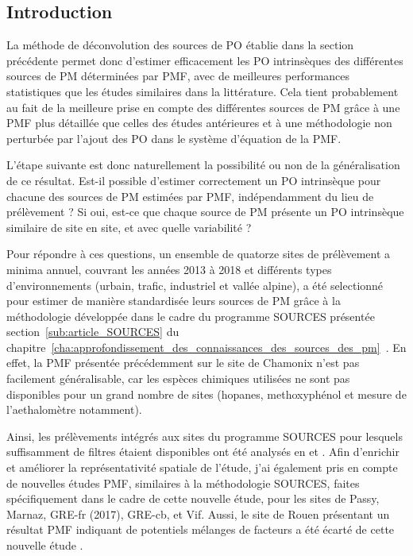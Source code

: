 \subsection{Introduction}%
\label{sub:introduction_synthèse_nationale}

La méthode de déconvolution des sources de PO établie dans la section précédente permet
donc d'estimer efficacement les PO intrinsèques des différentes sources de PM déterminées
par PMF, avec de meilleures performances statistiques que les études similaires dans la
littérature.  Cela tient probablement au fait de la meilleure prise en compte des
différentes sources de PM grâce à une PMF plus détaillée que celles des études antérieures
et à une méthodologie non perturbée par l'ajout des PO dans le système d'équation de la PMF.

L'étape suivante est donc naturellement la possibilité ou non de la généralisation de ce
résultat.  Est-il possible d'estimer correctement un PO intrinsèque pour chacune des
sources de PM estimées par PMF, indépendamment du lieu de prélèvement ? Si oui, est-ce que
chaque source de PM présente un PO intrinsèque similaire de site en site, et avec quelle
variabilité ?

Pour répondre à ces questions, un ensemble de quatorze sites de prélèvement a minima annuel,
couvrant les années 2013 à 2018 et différents types d'environnements (urbain, trafic,
industriel et vallée alpine),
a été selectionné pour estimer de manière standardisée leurs sources de PM grâce à la
méthodologie développée dans le cadre du programme SOURCES présentée
section~\ref{sub:article_SOURCES} du
chapitre~\ref{cha:approfondissement_des_connaissances_des_sources_des_pm}~\autocite{weberSources2019}.
En effet, la PMF présentée précédemment sur le site de
Chamonix n'est pas facilement généralisable, car les espèces chimiques utilisées ne sont
pas disponibles pour un grand nombre de sites (hopanes, methoxyphénol et mesure de
l'aethalomètre notamment).

Ainsi, les prélèvements intégrés aux sites du programme SOURCES pour lesquels suffisamment de filtres étaient
disponibles ont été analysés en \POAA{} et \PODTT. Afin d'enrichir et améliorer la
représentativité spatiale de l'étude, j'ai également pris en compte de nouvelles études
PMF, similaires à la méthodologie SOURCES, faites spécifiquement dans le cadre de cette
nouvelle étude, pour les sites de Passy, Marnaz, GRE-fr (2017), GRE-cb, et Vif.
Aussi, le site de Rouen présentant un résultat PMF indiquant de potentiels mélanges de
facteurs a été écarté de cette nouvelle étude \autocite{weberComparison2019}.


